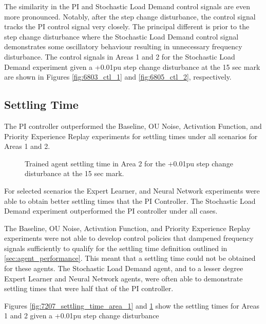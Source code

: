 The similarity in the PI and Stochastic Load Demand control signals are even more pronounced. Notably, after the step change disturbance, the control signal tracks the PI control signal very closely. The principal different is prior to the step change disturbance where the Stochastic Load Demand control signal demonstrates some oscillatory behaviour resulting in unnecessary frequency disturbance. The control signals in Areas 1 and 2 for the Stochastic Load Demand experiment given a +0.01pu step change disturbance at the 15 sec mark are shown in Figures \ref{fig:6803_ctl_1} and \ref{fig:6805_ctl_2}, respectively.


\subsection{Settling Time}
The PI controller outperformed the Baseline, OU Noise, Activation Function, and Priority Experience Replay experiments for settling times under all scenarios for Areas 1 and 2.

\begin{figure}[h]
	\begin{minipage}[t]{0.50\textwidth}
		\centering
		\resizebox{7cm}{!}{}
		\caption[Area 1 settling time comparison]{Trained agent settling time in Area 1 for the +0.01pu step change disturbance at the 15 sec mark.}\label{fig:7207_settling_time_area_1}
	\end{minipage}
	\hspace{0.25cm}
	\begin{minipage}[t]{0.50\textwidth}
		\resizebox{7cm}{!}{}
		\caption[Area 2 settling time comparison]{Trained agent settling time in Area 2 for the +0.01pu step change disturbance at the 15 sec mark.}\label{fig:7208_settling_time_area_2}
	\end{minipage}
\end{figure}

For selected scenarios the Expert Learner, and Neural Network experiments were able to obtain better settling times that the PI Controller. The Stochastic Load Demand experiment outperformed the PI controller under all cases.

The Baseline, OU Noise, Activation Function, and Priority Experience Replay experiments were not able to develop control policies that dampened frequency signals sufficiently to qualify for the settling time definition outlined in \textsection \ref{sec:agent_performance}. This meant that a settling time could not be obtained for these agents. The Stochastic Load Demand agent, and to a lesser degree Expert Learner and Neural Network agents, were often able to demonstrate settling times that were half that of the PI controller.

Figures \ref{fig:7207_settling_time_area_1} and \ref{fig:7208_settling_time_area_2} show the settling times for Areas 1 and 2 given a +0.01pu step change disturbance 
